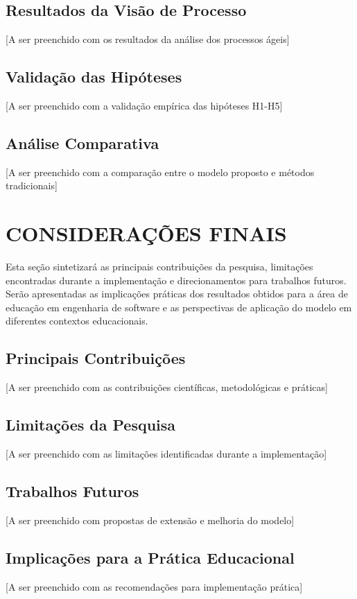 \documentclass[12pt,a4paper]{article}
\begin{document}
\subsection{Resultados da Visão de Processo}

[A ser preenchido com os resultados da análise dos processos ágeis]

\subsection{Validação das Hipóteses}

[A ser preenchido com a validação empírica das hipóteses H1-H5]

\subsection{Análise Comparativa}

[A ser preenchido com a comparação entre o modelo proposto e métodos tradicionais]

\section{CONSIDERAÇÕES FINAIS}

Esta seção sintetizará as principais contribuições da pesquisa, limitações encontradas durante a implementação e direcionamentos para trabalhos futuros. Serão apresentadas as implicações práticas dos resultados obtidos para a área de educação em engenharia de software e as perspectivas de aplicação do modelo em diferentes contextos educacionais.

\subsection{Principais Contribuições}

[A ser preenchido com as contribuições científicas, metodológicas e práticas]

\subsection{Limitações da Pesquisa}

[A ser preenchido com as limitações identificadas durante a implementação]

\subsection{Trabalhos Futuros}

[A ser preenchido com propostas de extensão e melhoria do modelo]

\subsection{Implicações para a Prática Educacional}

[A ser preenchido com as recomendações para implementação prática]

\def\refname{REFERÊNCIAS BIBLIOGRÁFICAS}


\end{document}
